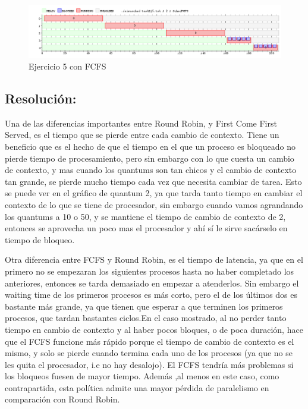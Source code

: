 \documentclass[10pt, a4paper]{article}
\begin{document}
\begin{figure}[H]
  	\centering
   	\includegraphics[width=1\textwidth]
   	 {imgs/ej6.png}
	\caption{Ejercicio 5 con FCFS}
\end{figure}
\subsection{Resolución:}

Una de las diferencias importantes entre Round Robin, y First Come First Served, es el tiempo que se pierde entre cada cambio de contexto.
Tiene un beneficio que es el hecho de  que el tiempo en el que un proceso es bloqueado no pierde tiempo de procesamiento, pero sin embargo con 
lo que cuesta un cambio de contexto, y mas cuando los quantums son tan chicos y el cambio de contexto tan grande, se pierde mucho tiempo
cada vez que necesita cambiar de tarea.
Esto se puede ver en el gráfico de quantum 2, ya que tarda tanto tiempo en cambiar el contexto de lo que se tiene de procesador, sin embargo
cuando vamos agrandando los quantums a 10 o 50, y se mantiene el tiempo de cambio de contexto de 2, entonces se aprovecha un poco mas el procesador
y ahí sí le sirve sacárselo en tiempo de bloqueo.

Otra diferencia entre FCFS y Round Robin, es el tiempo de latencia, ya que en el primero no se empezaran los siguientes procesos hasta no haber completado los anteriores, entonces se tarda demasiado en empezar a atenderlos. Sin embargo el waiting time de los primeros procesos es más corto, pero el de los últimos dos es bastante más grande, ya que tienen que esperar a que terminen los primeros procesos, que tardan bastantes ciclos.En el caso mostrado, al no perder tanto tiempo en cambio de contexto y al haber pocos bloques, o de poca duración, hace que el FCFS funcione más rápido porque el tiempo de cambio de contexto es el mismo, y solo se pierde cuando termina cada uno de los procesos (ya que no se les quita el procesador, i.e no hay desalojo). El FCFS tendría más problemas si los bloqueos fuesen de mayor tiempo. Además ,al menos en este caso, como contrapartida, esta política admite una mayor pérdida de paralelismo en comparación con Round Robin.
\end{document}
